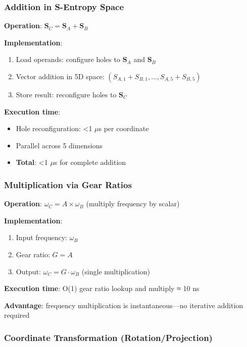 \documentclass[11pt,a4paper]{article}
\begin{document}
\subsubsection{Addition in S-Entropy Space}

\textbf{Operation}: $\mathbf{S}_C = \mathbf{S}_A + \mathbf{S}_B$

\textbf{Implementation}:
\begin{enumerate}
\item Load operands: configure holes to $\mathbf{S}_A$ and $\mathbf{S}_B$
\item Vector addition in 5D space: $(S_{A,1} + S_{B,1}, \ldots, S_{A,5} + S_{B,5})$
\item Store result: reconfigure holes to $\mathbf{S}_C$
\end{enumerate}

\textbf{Execution time}:
\begin{itemize}
\item Hole reconfiguration: <1 $\mu$s per coordinate
\item Parallel across 5 dimensions
\item \textbf{Total}: <1 $\mu$s for complete addition
\end{itemize}

\subsubsection{Multiplication via Gear Ratios}

\textbf{Operation}: $\omega_C = A \times \omega_B$ (multiply frequency by scalar)

\textbf{Implementation}:
\begin{enumerate}
\item Input frequency: $\omega_B$
\item Gear ratio: $G = A$
\item Output: $\omega_C = G \cdot \omega_B$ (single multiplication)
\end{enumerate}

\textbf{Execution time}: O(1) gear ratio lookup and multiply ≈ 10 ns

\textbf{Advantage}: frequency multiplication is instantaneous—no iterative addition required

\subsubsection{Coordinate Transformation (Rotation/Projection)}
\end{document}
